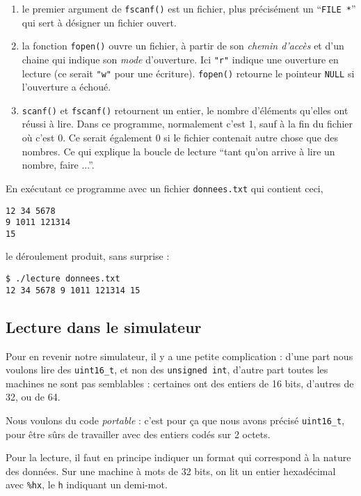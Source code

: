 \documentclass[10pt]{article}
\begin{document}


\begin{enumerate}
\item le premier argument de \texttt{fscanf()} est un fichier, plus précisément
un ``\texttt{FILE *}'' qui sert à désigner un fichier ouvert.
\item la fonction \texttt{fopen()} ouvre un fichier, à partir de son \emph{chemin d'accès} et d'un chaine qui indique son \emph{mode} d'ouverture. Ici \texttt{"r"} indique une ouverture en lecture (ce serait \texttt{"w"} pour une écriture).
\texttt{fopen()} retourne le pointeur \texttt{NULL} si l'ouverture a échoué.
\item \texttt{scanf()} et \texttt{fscanf()} retournent un entier, le
  nombre d'éléments qu'elles ont réussi à lire. Dans ce programme,
  normalement c'est 1, sauf à la fin du fichier où c'est 0. Ce serait
  également 0 si le fichier contenait autre chose que des nombres.
Ce qui explique la boucle de lecture ``tant qu'on arrive à lire un nombre, faire ...''.
\end{enumerate}

En exécutant ce programme avec un fichier \texttt{donnees.txt} qui
contient ceci, 
\begin{verbatim}
12 34 5678
9 1011 121314
15
\end{verbatim}
le déroulement produit, sans surprise :
\begin{verbatim}
$ ./lecture donnees.txt
12 34 5678 9 1011 121314 15 
\end{verbatim}

\subsection{Lecture dans le simulateur}

Pour en revenir notre simulateur, il y a une petite complication : d'une part 
nous voulons lire des \texttt{uint16\_t}, et non des \texttt{unsigned int},
d'autre part toutes les machines ne sont pas semblables : certaines ont des
entiers de 16 bits, d'autres de 32, ou de 64.

Nous voulons du code \emph{portable} : c'est pour ça que nous avons précisé
\texttt{uint16\_t}, pour être sûrs de travailler avec des entiers codés
sur 2 octets.

Pour la lecture, il faut en principe indiquer un format qui correspond
à la nature des données. Sur une machine à mots de 32 bits, on lit un 
entier hexadécimal avec \texttt{\%hx}, le \texttt{h} indiquant un demi-mot.
\end{document}
